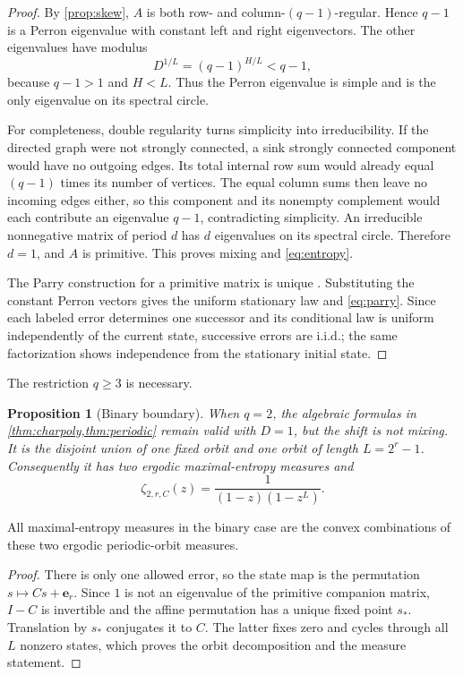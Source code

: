 \documentclass[11pt,a4paper]{amsart}
\newtheorem{proposition}[theorem]{Proposition}
\theoremstyle{definition}
\theoremstyle{remark}
\begin{document}
\begin{proof}
By \cref{prop:skew}, $A$ is both row- and column-$(q-1)$-regular.  Hence
$q-1$ is a Perron eigenvalue with constant left and right eigenvectors.  The
other eigenvalues have modulus
\[
 D^{1/L}=(q-1)^{H/L}<q-1,
\]
because $q-1>1$ and $H<L$.  Thus the Perron eigenvalue is simple and is the
only eigenvalue on its spectral circle.

For completeness, double regularity turns simplicity into irreducibility.
If the directed graph were not strongly connected, a sink strongly
connected component would have no outgoing edges.  Its total internal row
sum would already equal $(q-1)$ times its number of vertices.  The equal
column sums then leave no incoming edges either, so this component and its
nonempty complement would each contribute an eigenvalue $q-1$, contradicting
simplicity.  An irreducible nonnegative matrix of period $d$ has $d$
eigenvalues on its spectral circle.  Therefore $d=1$, and $A$ is primitive.
This proves mixing and \eqref{eq:entropy}.

The Parry construction for a primitive matrix is unique
\cite{Parry1964}.  Substituting the constant Perron vectors gives the
uniform stationary law and \eqref{eq:parry}.
Since each labeled error determines one successor and its conditional law is
uniform independently of the current state, successive errors are i.i.d.;
the same factorization shows independence from the stationary initial state.
\end{proof}

The restriction $q\geq3$ is necessary.

\begin{proposition}[Binary boundary]
\label{prop:binary}
When $q=2$, the algebraic formulas in \cref{thm:charpoly,thm:periodic} remain
valid with $D=1$, but the shift is not mixing.  It is the disjoint union of
one fixed orbit and one orbit of length $L=2^r-1$.  Consequently it has two
ergodic maximal-entropy measures and
\[
 \zeta_{2,r,C}(z)=\frac1{(1-z)(1-z^L)}.
\]
\end{proposition}

All maximal-entropy measures in the binary case are the convex combinations
of these two ergodic periodic-orbit measures.

\begin{proof}
There is only one allowed error, so the state map is the permutation
$s\mapsto Cs+\mathbf e_r$.  Since $1$ is not an eigenvalue of the primitive
companion matrix, $I-C$ is invertible and the affine permutation has a unique
fixed point $s_*$.  Translation by $s_*$ conjugates it to $C$.  The latter
fixes zero and cycles through all $L$ nonzero states, which proves the orbit
decomposition and the measure statement.
\end{proof}
\end{document}
